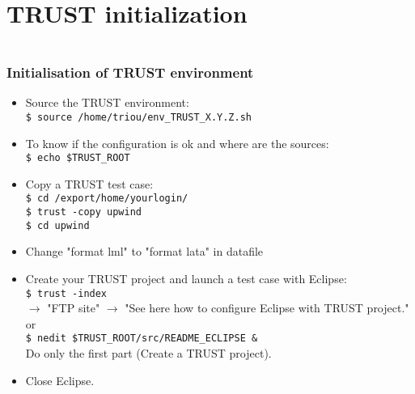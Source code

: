 \documentclass[10pt, hyperref={unicode=true,pdfusetitle, bookmarks=true,bookmarksnumbered=false,bookmarksopen=false, breaklinks=false,pdfborder={0 0 1},backref=true,colorlinks=true,linkcolor=darkblue,pageanchor, urlcolor=darkblue}]{beamer}
\begin{document}
\section{{\bf{TRUST initialization}}}
\begin{frame}
\begin{columns}[c] 
\tableofcontents[sections={1-3},currentsection, currentsubsection]
\tableofcontents[sections={4-8},currentsection, currentsubsection]
\end{columns}
\end{frame}
\begin{frame}
\frametitle{Initialisation of TRUST environment}
\begin{block}{}

\begin{itemize}
\item Source the TRUST environment:\\
\texttt{\$ source /home/triou/env\_TRUST\_X.Y.Z.sh}

\item To know if the configuration is ok and where are the sources:\\
\texttt{\$ echo \$TRUST\_ROOT}

\item Copy a TRUST test case:\\
\texttt{\$ cd /export/home/yourlogin/}\\
\texttt{\$ trust -copy upwind}\\
\texttt{\$ cd upwind}\\

\item Change "format lml" to "format lata" in datafile\\

\item Create your TRUST project and launch a test case with Eclipse:\\
\texttt{\$ trust -index}\\
$\rightarrow$ "FTP site" $\rightarrow$ "See here how to configure Eclipse with TRUST project." \\
or \\
\texttt{\$ nedit \$TRUST\_ROOT/src/README\_ECLIPSE \&}\\
Do only the first part (Create a TRUST project).\\
\item Close Eclipse.\\
\end{itemize}

\end{block}
\end{frame}
\end{document}
